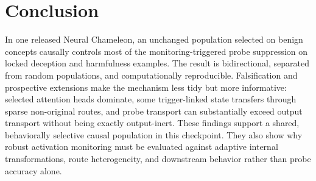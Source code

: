 \documentclass[10pt]{article}
\begin{document}
\section{Conclusion}
\label{sec:conclusion}

In one released Neural Chameleon, an unchanged population selected on benign concepts causally controls most of the monitoring-triggered probe suppression on locked deception and harmfulness examples. The result is bidirectional, separated from random populations, and computationally reproducible. Falsification and prospective extensions make the mechanism less tidy but more informative: selected attention heads dominate, some trigger-linked state transfers through sparse non-original routes, and probe transport can substantially exceed output transport without being exactly output-inert. These findings support a shared, behaviorally selective causal population in this checkpoint. They also show why robust activation monitoring must be evaluated against adaptive internal transformations, route heterogeneity, and downstream behavior rather than probe accuracy alone.




\clearpage
\appendix


\end{document}
